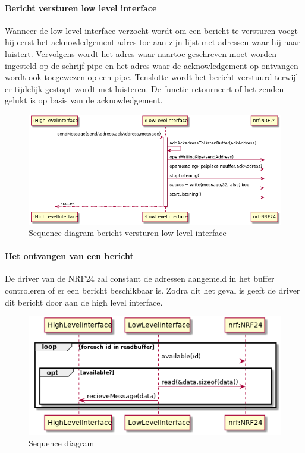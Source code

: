 \documentclass[a4paper, 11pt, oneside]{report}
\begin{document}
\paragraph{Bericht versturen low level interface}
\label{DetailedDesign:NRF24:sequence:lowlevelSendMessage}
Wanneer de low level interface verzocht wordt om een bericht te versturen voegt hij eerst het acknowledgement adres toe aan zijn lijst met adressen waar hij naar luistert. 
Vervolgens wordt het adres waar naartoe geschreven moet worden ingesteld op de schrijf pipe en het adres waar de acknowledgement op ontvangen wordt ook toegewezen op een pipe.
Tenslotte wordt het bericht verstuurd terwijl er tijdelijk gestopt wordt met luisteren.
De functie retourneert of het zenden gelukt is op basis van de acknowledgement.    
\begin{figure}[H]
	\begin{center}\includegraphics[width=1\linewidth]{UML/out/NRF24/sequence/lowlevelSendMessage/lowlevelSendMessage.png}\end{center}
	\caption{Sequence diagram bericht versturen low level interface}
	\label{fig:NRF24:sequence:lowlevelSendMessage}
\end{figure}

\paragraph{Het ontvangen van een bericht}
\label{DetailedDesign:NRF24:sequence:recieveMessage}

De driver van de NRF24 zal constant de adressen aangemeld in het buffer controleren of er een bericht beschikbaar is. 
Zodra dit het geval is geeft de driver dit bericht door aan de high level interface.

\begin{figure}[H]
	\begin{center}\includegraphics[width=.6\linewidth]{UML/out/NRF24/sequence/recieveMessage/recieveMessage.png}\end{center}
	\caption{Sequence diagram }
	\label{fig:NRF24:sequence:recieveMessage}
\end{figure}
\end{document}
